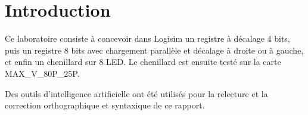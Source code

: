 \section{Introduction}

Ce laboratoire consiste à concevoir dans Logisim un registre à décalage 4 bits, puis un registre 8 bits avec chargement parallèle et décalage à droite ou à gauche, et enfin un chenillard sur 8 LED. Le chenillard est ensuite testé sur la carte MAX\_V\_\allowbreak 80P\_25P.
\vspace{1\baselineskip}

Des outils d'intelligence artificielle ont été utilisés pour la relecture et la correction orthographique et syntaxique de ce rapport.
